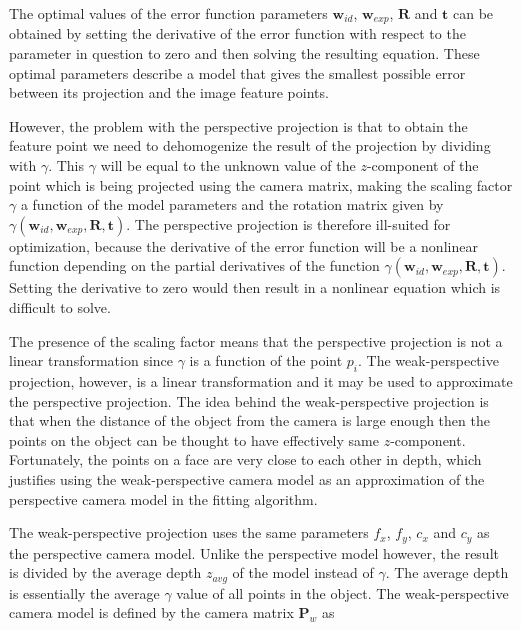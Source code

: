 \documentclass[11pt,a4paper,twoside]{report}
\begin{document}
The optimal values of the error function parameters $\mathbf{w}_{id}$, $\mathbf{w}_{exp}$,
$\mathbf{R}$ and $\mathbf{t}$ can be obtained by setting the derivative of the
error function with respect to the parameter in question to zero and then
solving the resulting equation. These optimal parameters describe a model that
gives the smallest possible error between its projection and the image feature points.


However, the problem with the perspective projection is that to obtain the feature point
we need to dehomogenize the result of the projection by dividing with
$\gamma$. This $\gamma$ will be equal to the unknown value of the $z$-component of the point
which is being projected using the camera matrix, making the scaling factor $\gamma$ a function of the model parameters and the rotation
matrix given by $\gamma(\mathbf{w}_{id},\mathbf{w}_{exp},\mathbf{R},\mathbf{t})$. The
  perspective projection is therefore ill-suited for optimization, because the derivative of the error function will be
a nonlinear function depending on the partial derivatives of the function
$\gamma(\mathbf{w}_{id},\mathbf{w}_{exp},\mathbf{R},\mathbf{t})$. Setting the derivative to
  zero would then result in a nonlinear equation which is difficult to solve.

The presence of the scaling factor means that the perspective projection is not a linear transformation since $\gamma$ is a
function of the point $p_i$. The weak-perspective projection, however, is a linear
transformation and it may be used to approximate the perspective projection. The idea
behind the weak-perspective projection is that when the distance of the object
from the camera is large enough then the points on the object can be thought to have effectively same
$z$-component. Fortunately, the points on a face are very close to each other in depth, which justifies using the weak-perspective camera model as an approximation
of the perspective camera model in the fitting algorithm. 

The weak-perspective projection uses the same parameters $f_x$, $f_y$, $c_x$ and
$c_y$ as the perspective camera model. Unlike the perspective model however, the
result is divided by the average depth $z_{avg}$ of the model instead of
$\gamma$. The average depth is essentially the average $\gamma$ value of all points
in the object. The weak-perspective camera model is defined by the camera matrix
$\mathbf{P}_w$ as 
\end{document}
